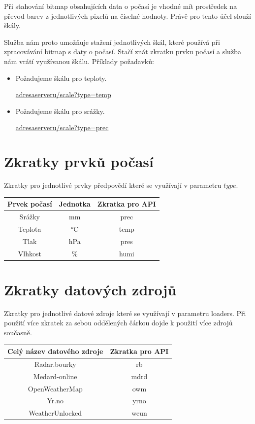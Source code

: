 \documentclass[czech,bachelor,dept460,male,csharp,cpdeclaration]{diploma}
\begin{document}
	Při stahování bitmap obsahujících data o počasí je vhodné mít prostředek na převod barev z jednotlivých pixelů na číselné hodnoty. Právě pro tento účel slouží škály.
	
	Služba nám proto umožňuje stažení jednotlivých škál, které používá při zpracovávání bitmap s daty o počasí. Stačí znát zkratku prvku počasí a služba nám vrátí využívanou škálu.
	\newpage
	Příklady požadavků:
	\begin{itemize}
		\item Požadujeme škálu pro teploty.
		
		\url{adresaserveru/scale?type=temp}
		
		\item Požadujeme škálu pro srážky.
		
		\url{adresaserveru/scale?type=prec}
		
	\end{itemize}
	
	\section{Zkratky prvků počasí}
	
	Zkratky pro jednotlivé prvky předpovědí které se využívají v parametru $type$.
	
	\begin{center}
		
		
		\begin{tabular}{c c c}
			Prvek počasí & Jednotka & Zkratka pro API\\
			\midrule
			Srážky & mm & prec \\
			Teplota & °C & temp \\
			Tlak & hPa & pres \\
			Vlhkost & \% & humi \\
		\end{tabular}
	\end{center}
	
	\section{Zkratky datových zdrojů}
	
	Zkratky pro jednotlivé datové zdroje které se využívají v parametru loaders. Při použití více zkratek za sebou oddělených čárkou dojde k použití více zdrojů současně.
	
	\begin{center}
		
		
		\begin{tabular}{c c}
			Celý název datového zdroje & Zkratka pro API\\
			\midrule
			Radar.bourky & rb \\
			Medard-online & mdrd \\
			OpenWeatherMap & owm \\
			Yr.no & yrno \\
			WeatherUnlocked & weun \\
		\end{tabular}
	\end{center}
	
\end{document}
